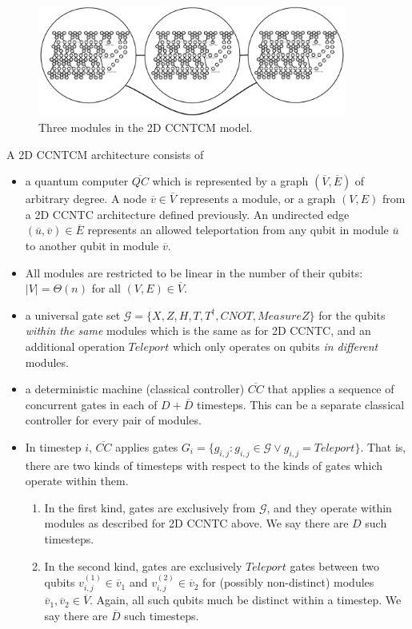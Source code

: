 \begin{figure}[btp!]
\begin{center}
\includegraphics[width=4in]{factor-polylog/figures/modules.pdf}
\end{center}
\caption{Three modules in the \textsf{2D CCNTCM} model.}
\label{fig:modules}
\end{figure}

\begin{definition}
A \textsf{2D CCNTCM} architecture consists of

\begin{itemize}
\item a quantum computer $\overline{QC}$ which is represented by a graph
$(\overline{V},\overline{E})$ of arbitrary degree.
A node $\overline{v} \in \overline{V}$ represents a module,
or a graph $(V,E)$
from a \textsf{2D CCNTC} architecture defined previously.
An
undirected edge $(\overline{u},\overline{v}) \in \overline{E}$ represents an
allowed teleportation from any qubit in module $\overline{u}$ to
another qubit in module $\overline{v}$.
\item All modules are restricted to be linear in the number of their qubits:
$|V| = \Theta(n)$ for all $(V,E) \in \overline{V}$.
\item a universal gate set $\mathcal{G} = \{X, Z, H, T, T^{\dagger}, CNOT,
MeasureZ\}$
for the qubits \emph{within the same} modules which is the same as for \textsf{2D CCNTC},
and an additional operation $Teleport$ which only operates on qubits
\emph{in
different} modules.
\item a deterministic machine (classical controller) $\overline{CC}$ that applies a sequence
of concurrent gates in each of $D+\overline{D}$ timesteps.
This can be a separate classical controller
for every pair of modules.
\item In timestep $i$, $\overline{CC}$ applies
gates $G_i = \{g_{i,j} : g_{i,j} \in \mathcal{G} \lor g_{i,j} = Teleport \}$.
That is, there are two kinds of timesteps with respect to the kinds of gates
which operate within them.
\begin{enumerate}
\item In the first kind, gates are exclusively from $\mathcal{G}$, and
they operate within modules as described
for \textsf{2D CCNTC} above. We say there are $D$ such timesteps.
\item In the second kind, gates are exclusively $Teleport$ gates between two qubits $v^{(1)}_{i,j} \in \overline{v}_1$ and
$v^{(2)}_{i,j} \in \overline{v}_2$ for
(possibly non-distinct) modules $\overline{v}_1, \overline{v}_2 \in \overline{V}$.
Again, all such qubits much be distinct within a timestep.
We say there are $\overline{D}$ such timesteps.
\end{enumerate}


\end{itemize}
\end{definition}
